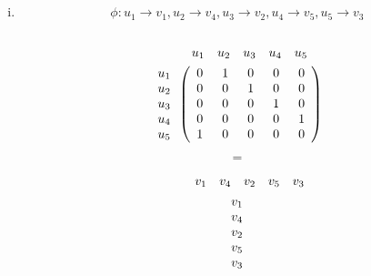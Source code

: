 \documentclass{article}
\begin{document}
\section{}
\begin{enumerate}[i)]
\item
$$\phi:u_1\to v_1,u_2\to v_4,u_3\to v_2,u_4\to v_5,u_5\to v_3$$
\begin{minipage}{0.1\linewidth}
$$$$
\end{minipage}
\hfill
\begin{minipage}{0.33\linewidth}
\begin{gather*}
\begin{array}{c@{\hspace{2em}}ccccc}
&u_1&u_2&u_3&u_4&u_5
\end{array}
\\
\begin{array}{c}
u_1\\u_2\\u_3\\u_4\\u_5
\end{array}\left(
\begin{array}{c@{\hspace{1.5em}}c@{\hspace{1.5em}}c@{\hspace{1.5em}}c@{\hspace{1.5em}}c}
0&1&0&0&0\\
0&0&1&0&0\\
0&0&0&1&0\\
0&0&0&0&1\\
1&0&0&0&0\\
\end{array}\right)
\end{gather*}
\end{minipage}
\hfill
\begin{minipage}{0.05\linewidth}
$$=$$
\end{minipage}
\hfill
\begin{minipage}{0.33\linewidth}
\begin{gather*}
\begin{array}{c@{\hspace{2em}}ccccc}
&v_1&v_4&v_2&v_5&v_3
\end{array}
\\
\begin{array}{c}
v_1\\v_4\\v_2\\v_5\\v_3

\end{array}
\end{gather*}
\end{minipage}
\end{enumerate}
\end{document}
